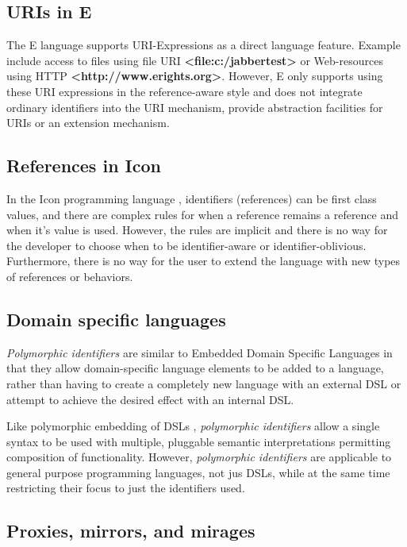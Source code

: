 \documentclass[preprint,authoryear]{acm_proc_article-sp}
\begin{document}
\subsection{URIs in E}

The E language\cite{MillerRobustComposition}  supports URI-Expressions as a
direct language feature.  Example include access to files
using file URI  {\bf <file:c:/jabbertest>} or Web-resources using HTTP {\bf <http://www.erights.org>}.  However,
E only supports using these URI expressions in the reference-aware style and does not integrate 
ordinary identifiers into the URI mechanism, provide abstraction facilities 
for URIs or an extension mechanism. 


\subsection{References in Icon}

In the Icon programming language \cite{IconRef} , identifiers (references) can be first class values,
and there are complex rules for when a reference remains a reference and when
it's value is used.  However, the rules are implicit and there is no way for the 
developer to choose when to be identifier-aware or identifier-oblivious.  Furthermore,
there is no way for the user to extend the language with new types of references 
or behaviors.



\subsection{Domain specific languages}

\emph{Polymorphic identifiers} are similar to Embedded Domain Specific Languages\cite{edsl}
in that they allow domain-specific language elements to be added to a language, rather
than having to create a completely new language with an external DSL or attempt to 
achieve the desired effect with an internal DSL\cite{fowlerdsl}.  

Like polymorphic embedding of DSLs \cite{polydsl}, \emph{polymorphic identifiers} allow
a single syntax to be used with multiple, pluggable semantic interpretations permitting
composition of functionality\cite{embeddeddsl}.  However, \emph{polymorphic identifiers}
are applicable to general purpose programming languages, not jus DSLs, while
at the same time restricting their focus to just the identifiers used.

\subsection{Proxies, mirrors, and mirages}
\end{document}
